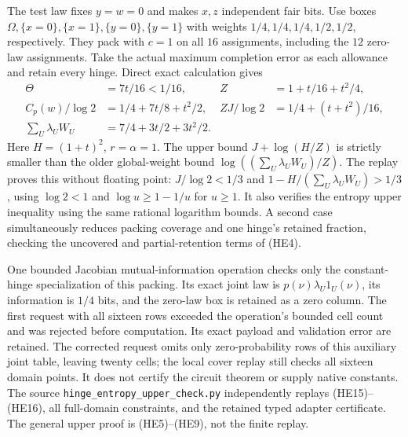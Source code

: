 \documentclass[11pt]{article}
\newcommand{\Om}{\Omega}
\begin{document}
The test law fixes $y=w=0$ and makes $x,z$ independent fair bits.
Use boxes $\Om,\{x=0\},\{x=1\},\{y=0\},\{y=1\}$ with weights
$1/4,1/4,1/4,1/2,1/2$, respectively. They pack with $c=1$ on
all $16$ assignments, including the $12$ zero-law assignments.
Take the actual maximum completion error as each allowance and
retain every hinge. Direct exact calculation gives
\[
 \begin{split}
 \Theta&=7t/16<1/16,&
 Z&=1+t/16+t^2/4,\\
 C_p(w)/\log2&=1/4+7t/8+t^2/2,&
 ZJ/\log2&=1/4+(t+t^2)/16,\\
 \sum_U\lambda_UW_U&=7/4+3t/2+3t^2/2.                \tag{HE16}
 \end{split}
\]
Here $H=(1+t)^2$, $r=\alpha=1$. The upper bound
$J+\log(H/Z)$ is strictly smaller than the older global-weight
bound $\log((\sum_U\lambda_UW_U)/Z)$. The replay proves this
without floating point: $J/\log2<1/3$ and
$1-H/(\sum_U\lambda_UW_U)>1/3$, using
$\log2<1$ and $\log u\ge1-1/u$ for $u\ge1$.
It also verifies the entropy upper inequality using the same
rational logarithm bounds. A second case simultaneously reduces
packing coverage and one hinge's retained fraction, checking
the uncovered and partial-retention terms of (HE4).

One bounded Jacobian mutual-information operation checks only
the constant-hinge specialization of this packing. Its exact
joint law is $p(\nu)\lambda_U1_U(\nu)$, its information is
$1/4$ bits, and the zero-law box is retained as a zero column.
The first request with all sixteen rows exceeded the operation's
bounded cell count and was rejected before computation. Its exact
payload and validation error are retained. The corrected request
omits only zero-probability rows of this auxiliary joint table,
leaving twenty cells; the local cover replay still checks all
sixteen domain points.
It does not certify the circuit theorem or supply native constants.
The source \texttt{hinge\_entropy\_upper\_check.py} independently
replays (HE15)--(HE16), all full-domain constraints, and the
retained typed adapter certificate. The general upper proof
is (HE5)--(HE9), not the finite replay.
\end{document}
